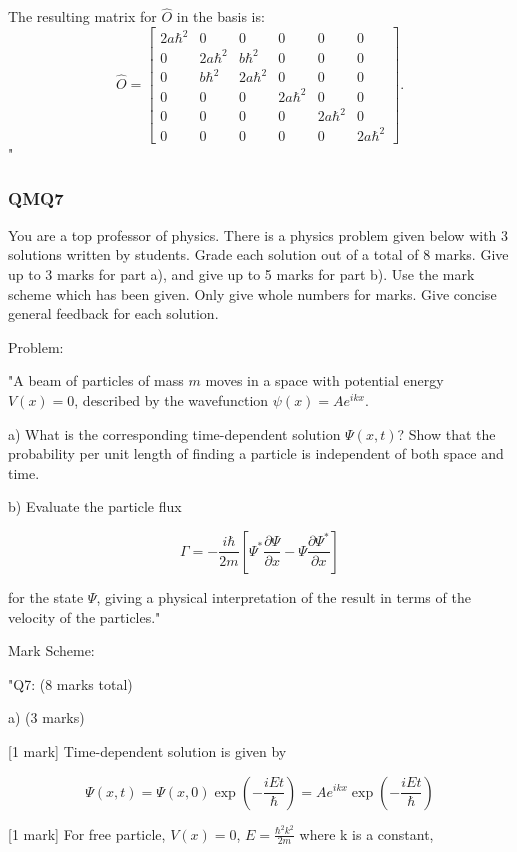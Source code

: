 The resulting matrix for $\hat{O}$ in the basis is:
\[
\hat{O} = 
\begin{bmatrix}
2a\hbar^2 & 0 & 0 & 0 & 0 & 0 \\
0 & 2a\hbar^2 & b\hbar^2 & 0 & 0 & 0 \\
0 & b\hbar^2 & 2a\hbar^2 & 0 & 0 & 0 \\
0 & 0 & 0 & 2a\hbar^2 & 0 & 0 \\
0 & 0 & 0 & 0 & 2a\hbar^2 & 0 \\
0 & 0 & 0 & 0 & 0 & 2a\hbar^2
\end{bmatrix}.
\]
"

\subsubsection{QMQ7}

You are a top professor of physics. There is a physics problem given below with 3 solutions written by students. Grade each solution out of a total of 8 marks. Give up to 3 marks for part a), and give up to 5 marks for part b). Use the mark scheme which has been given. Only give whole numbers for marks. Give concise general feedback for each solution. 

Problem:

"A beam of particles of mass \( m \) moves in a space with potential energy \( V(x) = 0 \), described by the wavefunction \( \psi(x) = Ae^{ikx} \).

a) What is the corresponding time-dependent solution \( \Psi(x,t) \)? Show that the probability per unit length of finding a particle is independent of both space and time.

b) Evaluate the particle flux 

\[ \Gamma = -\frac{i\hbar}{2m}\left[ \Psi^{*}\frac{\partial\Psi}{\partial x} - \Psi\frac{\partial\Psi^{*}}{\partial x} \right] \]

for the state \( \Psi \), giving a physical interpretation of the result in terms of the velocity of the particles."

Mark Scheme:

"{Q7: (8 marks total)}

a) (3 marks)

[1 mark] Time-dependent solution is given by 

\[ \Psi(x,t) = \Psi(x,0) \exp(- \frac{iEt}{\hbar}) =  Ae^{ikx} \exp(- \frac{iEt}{\hbar})  \]

[1 mark] For free particle, \( V(x) = 0 \), \( E = \frac{\hbar^2 k^2}{2m} \) where k is a constant, 

